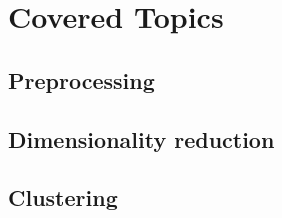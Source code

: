 \documentclass[paper=a4, fontsize=10pt]{scrartcl} %
\numberwithin{equation}{section} %
\numberwithin{figure}{section} %
\numberwithin{table}{section} %
\begin{document}
\section{Covered Topics}

\subsection{Preprocessing}
\subsection{Dimensionality reduction}
\subsection{Clustering}


\end{document}
